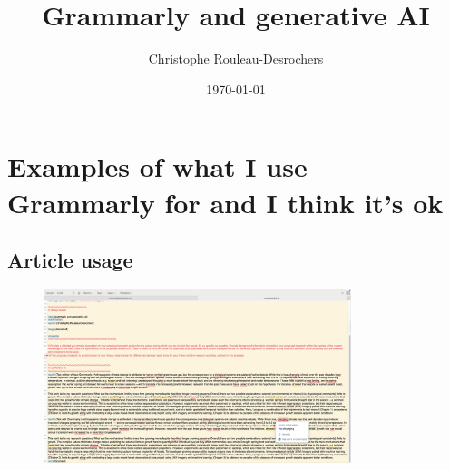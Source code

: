 \documentclass[12pt]{article}
\title{Grammarly and generative AI}
\date{\today}
\author{Christophe Rouleau-Desrochers}
\begin{document}
\maketitle



\section{Examples of what I use Grammarly for and I think it's ok}
\subsection{Article usage}
\begin{figure}[h!] 
    \centering
    \includegraphics[width=0.8\textwidth]{article.png} 
\end{figure}

\newpage
\end{document}
